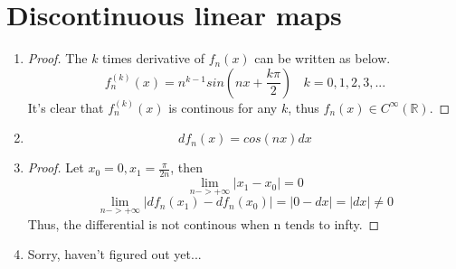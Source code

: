 \documentclass[paper=a4, fontsize=11pt]{scrartcl} %
\numberwithin{equation}{section} %
\numberwithin{figure}{section} %
\numberwithin{table}{section} %
\begin{document}
\section{Discontinuous linear maps}
\begin{enumerate}
	\item 
		\begin{proof}
			The $k$ times derivative of $f_n(x)$ can be written as below.
			\begin{equation}
				f_n^{(k)}(x) = n^{k-1} sin(nx+ \frac{k\pi}{2}) \ \ \ \ k = 0, 1, 2, 3, ...
			\end{equation}
			It's clear that $f_n^{(k)}(x)$ is continous for any $k$, thus $f_n(x) \in C^\infty(\mathbb{R})$.
		\end{proof}
	\item 
		\begin{equation}
			d f_n(x) = cos(nx) dx
		\end{equation}
	\item
		\begin{proof}
			Let $x_0 = 0, x_1 = \frac{\pi}{2n}$, then
			\begin{equation}
				\lim\limits_{n->+\infty} \vert x_1-x_0 \vert = 0
			\end{equation}
			\begin{equation}
				\lim\limits_{n->+\infty} \vert df_n(x_1) - df_n(x_0) \vert = \vert 0-dx \vert = |dx| \neq 0
			\end{equation}
			Thus, the differential is not continous when n tends to infty.
		\end{proof}
	\item 
		Sorry, haven't figured out yet...
		
	
\end{enumerate}

\end{document}
